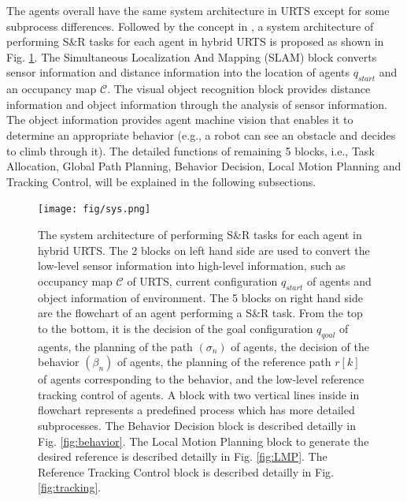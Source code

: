 \documentclass{ieeeaccess}
\begin{document}
The agents overall have the same system architecture in URTS except for some subprocess differences. Followed by the concept in \cite{paden2016survey}, a system architecture of performing S\&R tasks for each agent in hybrid URTS is proposed as shown in Fig. \ref{fig:sys}. The Simultaneous Localization And Mapping (SLAM) block converts sensor information and distance information into the location of agents $q_{start}$ and an occupancy map $\mathcal{C}$. The visual object recognition block provides distance information and object information through the analysis of sensor information. The object information provides agent machine vision that enables it to determine an appropriate behavior (e.g., a robot can see an obstacle and decides to climb through it). The detailed functions of remaining 5 blocks, i.e., Task Allocation, Global Path Planning, Behavior Decision, Local Motion Planning and Tracking Control, will be explained in the following subsections.


\begin{figure}[htbp]
    \centering
    \texttt{[image: fig/sys.png]}\caption{The system architecture of performing S\&R tasks for each agent in hybrid URTS. The 2 blocks on left hand side are used to convert the low-level sensor information into high-level information, such as occupancy map $\mathcal{C}$ of URTS, current configuration $q_{start}$ of agents and object information of environment. The 5 blocks on right hand side are the flowchart of an agent performing a S\&R task. From the top to the bottom, it is the decision of the goal configuration $q_{qoal}$ of agents, the planning of the path $(\sigma_n)$ of agents, the decision of the behavior $(\beta_n)$ of agents, the planning of the reference path $r[k]$ of agents corresponding to the behavior, and the low-level reference tracking control of agents. A block with two vertical lines inside in flowchart represents a predefined process which has more detailed subprocesses. The Behavior Decision block is described detailly in Fig. \ref{fig:behavior}. The Local Motion Planning block to generate the desired reference is described detailly in Fig. \ref{fig:LMP}. The Reference Tracking Control block is described detailly in Fig. \ref{fig:tracking}.}
    \label{fig:sys}
\end{figure}
\end{document}
